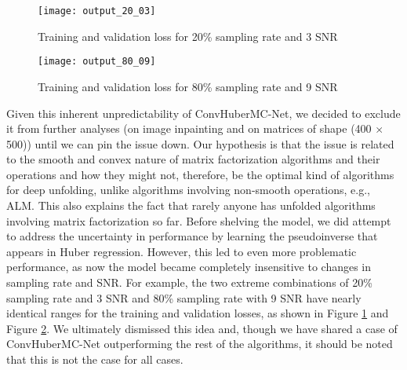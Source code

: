 \begin{figure}[htbp]
    \centering
    \texttt{[image: output\_20\_03]}
    \caption{Training and validation loss for 20\% sampling rate and 3 SNR}
    \label{fig:output_20_03}
\end{figure}

\begin{figure}[htbp]
    \centering
    \texttt{[image: output\_80\_09]}
    \caption{Training and validation loss for 80\% sampling rate and 9 SNR}
    \label{fig:output_80_09}
\end{figure}

Given this inherent unpredictability of ConvHuberMC-Net, we decided to exclude it from further analyses (on image inpainting and on matrices of shape (400 \(\times\) 500)) until we can pin the issue down. Our hypothesis is that the issue is related to the smooth and convex nature of matrix factorization algorithms and their operations and how they might not, therefore, be the optimal kind of algorithms for deep unfolding, unlike algorithms involving non-smooth operations, e.g., ALM. This also explains the fact that rarely anyone has unfolded algorithms involving matrix factorization so far. Before shelving the model, we did attempt to address the uncertainty in performance by learning the pseudoinverse that appears in Huber regression. However, this led to even more problematic performance, as now the model became completely insensitive to changes in sampling rate and SNR. For example, the two extreme combinations of 20\% sampling rate and 3 SNR and 80\% sampling rate with 9 SNR have nearly identical ranges for the training and validation losses, as shown in Figure \ref{fig:output_20_03} and Figure \ref{fig:output_80_09}. We ultimately dismissed this idea and, though we have shared a case of ConvHuberMC-Net outperforming the rest of the algorithms, it should be noted that this is not the case for all cases.

